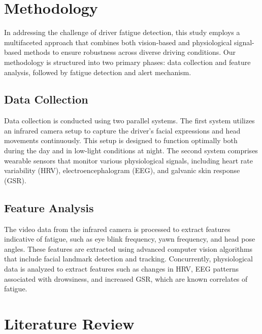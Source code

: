 \documentclass[a4paper]{article}
\begin{document}
\section{Methodology}
In addressing the challenge of driver fatigue detection, this study employs a multifaceted approach that combines both vision-based and physiological signal-based methods to ensure robustness across diverse driving conditions. Our methodology is structured into two primary phases: data collection and feature analysis, followed by fatigue detection and alert mechanism.
\subsection{Data Collection}
Data collection is conducted using two parallel systems. The first system utilizes an infrared camera setup to capture the driver's facial expressions and head movements continuously. This setup is designed to function optimally both during the day and in low-light conditions at night. The second system comprises wearable sensors that monitor various physiological signals, including heart rate variability (HRV), electroencephalogram (EEG), and galvanic skin response (GSR).
\subsection{Feature Analysis}
The video data from the infrared camera is processed to extract features indicative of fatigue, such as eye blink frequency, yawn frequency, and head pose angles. These features are extracted using advanced computer vision algorithms that include facial landmark detection and tracking. Concurrently, physiological data is analyzed to extract features such as changes in HRV, EEG patterns associated with drowsiness, and increased GSR, which are known correlates of fatigue.

\section{Literature Review}
\end{document}
